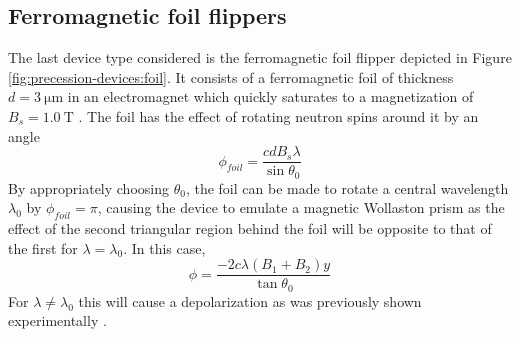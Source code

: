 \subsection{Ferromagnetic foil flippers}
The last device type considered is the ferromagnetic foil flipper depicted in Figure \ref{fig:precession-devices:foil}. It consists of a ferromagnetic foil of thickness $d = \SI{3}{\micro\meter}$ in an electromagnet which quickly saturates to a magnetization of $B_s = \SI{1.0}{\tesla}$ \cite{kraan2003}. The foil has the effect of rotating neutron spins around it by an angle 
$$\phi_{foil} = \frac{cdB_s\lambda}{\sin\theta_0}$$
By appropriately choosing $\theta_0$, the foil can be made to rotate a central wavelength $\lambda_0$ by $\phi_{foil} = \pi$, causing the device to emulate a magnetic Wollaston prism as the effect of the second triangular region behind the foil will be opposite to that of the first for $\lambda = \lambda_0$. In this case,
$$\phi = \frac{-2c\lambda (B_1 + B_2) y}{\tan{\theta_0}}$$
For $\lambda \neq \lambda_0$ this will cause a depolarization as was previously shown experimentally \cite{kraan2003}.
